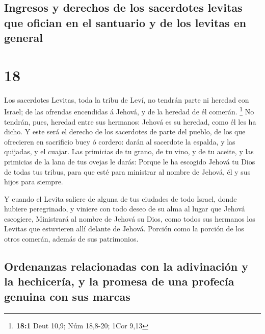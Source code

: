 \hypertarget{ingresos-y-derechos-de-los-sacerdotes-levitas-que-ofician-en-el-santuario-y-de-los-levitas-en-general}{%
\subsection{Ingresos y derechos de los sacerdotes levitas que ofician en
el santuario y de los levitas en
general}\label{ingresos-y-derechos-de-los-sacerdotes-levitas-que-ofician-en-el-santuario-y-de-los-levitas-en-general}}

\hypertarget{section-17}{%
\section{18}\label{section-17}}

 Los sacerdotes Levitas, toda la tribu de Leví, no tendrán
parte ni heredad con Israel; de las ofrendas encendidas á Jehová, y de
la heredad de él comerán. \footnote{\textbf{18:1} Deut 10,9; Núm
  18,8-20; 1Cor 9,13}  No tendrán, pues, heredad entre sus
hermanos: Jehová es su heredad, como él les ha dicho.  Y
este será el derecho de los sacerdotes de parte del pueblo, de los que
ofrecieren en sacrificio buey ó cordero: darán al sacerdote la espalda,
y las quijadas, y el cuajar.  Las primicias de tu grano, de
tu vino, y de tu aceite, y las primicias de la lana de tus ovejas le
darás:  Porque le ha escogido Jehová tu Dios de todas tus
tribus, para que esté para ministrar al nombre de Jehová, él y sus hijos
para siempre.

 Y cuando el Levita saliere de alguna de tus ciudades de
todo Israel, donde hubiere peregrinado, y viniere con todo deseo de su
alma al lugar que Jehová escogiere,  Ministrará al nombre de
Jehová su Dios, como todos sus hermanos los Levitas que estuvieren allí
delante de Jehová.  Porción como la porción de los otros
comerán, además de sus patrimonios.

\hypertarget{ordenanzas-relacionadas-con-la-adivinaciuxf3n-y-la-hechiceruxeda-y-la-promesa-de-una-profecuxeda-genuina-con-sus-marcas}{%
\subsection{Ordenanzas relacionadas con la adivinación y la hechicería,
y la promesa de una profecía genuina con sus
marcas}\label{ordenanzas-relacionadas-con-la-adivinaciuxf3n-y-la-hechiceruxeda-y-la-promesa-de-una-profecuxeda-genuina-con-sus-marcas}}


